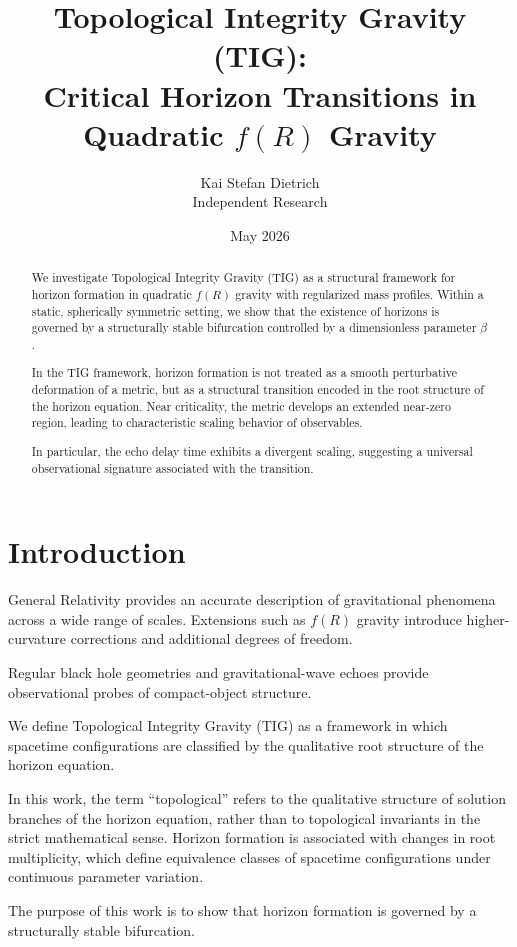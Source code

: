 \documentclass[11pt,a4paper]{article}
\title{Topological Integrity Gravity (TIG):\\
Critical Horizon Transitions in Quadratic $f(R)$ Gravity}
\author{Kai Stefan Dietrich\\
Independent Research}
\date{May 2026}
\begin{document}
\maketitle

\begin{abstract}
We investigate Topological Integrity Gravity (TIG) as a structural framework for horizon formation in quadratic $f(R)$ gravity with regularized mass profiles. Within a static, spherically symmetric setting, we show that the existence of horizons is governed by a structurally stable bifurcation controlled by a dimensionless parameter $\beta$.

In the TIG framework, horizon formation is not treated as a smooth perturbative deformation of a metric, but as a structural transition encoded in the root structure of the horizon equation. Near criticality, the metric develops an extended near-zero region, leading to characteristic scaling behavior of observables.

In particular, the echo delay time exhibits a divergent scaling, suggesting a universal observational signature associated with the transition.
\end{abstract}

\section{Introduction}

General Relativity provides an accurate description of gravitational phenomena across a wide range of scales. Extensions such as $f(R)$ gravity introduce higher-curvature corrections and additional degrees of freedom.

Regular black hole geometries and gravitational-wave echoes provide observational probes of compact-object structure.

We define Topological Integrity Gravity (TIG) as a framework in which spacetime configurations are classified by the qualitative root structure of the horizon equation.

In this work, the term ``topological'' refers to the qualitative structure of solution branches of the horizon equation, rather than to topological invariants in the strict mathematical sense. Horizon formation is associated with changes in root multiplicity, which define equivalence classes of spacetime configurations under continuous parameter variation.

The purpose of this work is to show that horizon formation is governed by a structurally stable bifurcation.
\end{document}
